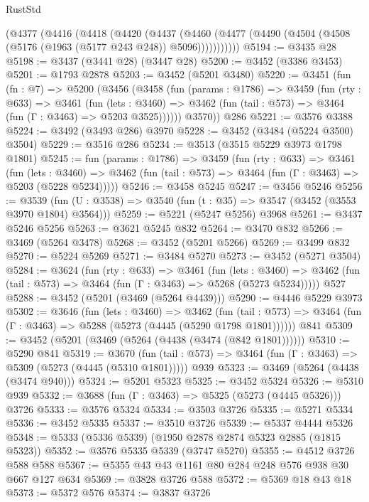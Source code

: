 \begin{lexlean}{RustStd}
\begin{coremodule}
    (@4377
      (@4416
        (@4418
          (@4420
            (@4437
              (@4460 (@4477 (@4490 (@4504 (@4508 (@5176 (@1963 (@5177 @243 @248)) @5096)))))))))))
@5194 := @3435 @28
@5198 := @3437 (@3441 @28) (@3447 @28)
@5200 := @3452 (@3386 @3453)
@5201 := @1793 @2878
@5203 := @3452 (@5201 @3480)
@5220 := @3451
    (fun (fn : @7) =>
    @5200
      (@3456
        (@3458
          (fun (params : @1786) =>
          @3459
            (fun (rty : @633) =>
            @3461
              (fun (lets : @3460) =>
              @3462 (fun (tail : @573) => @3464 (fun (Γ : @3463) => @5203 @3525))))))
        @3570))
    @286
@5221 := @3576 @3388
@5224 := @3492 (@3493 @286) @3970
@5228 := @3452 (@3484 (@5224 @3500) @3504)
@5229 := @3516 @286
@5234 := @3513 (@3515 @5229 @3973 @1798 @1801)
@5245 := fun (params : @1786) =>
  @3459
    (fun (rty : @633) =>
    @3461
      (fun (lets : @3460) =>
      @3462 (fun (tail : @573) => @3464 (fun (Γ : @3463) => @5203 (@5228 @5234)))))
@5246 := @3458 @5245
@5247 := @3456 @5246
@5256 := @3539 (fun (U : @3538) => @3540 (fun (t : @35) => @3547 (@3452 (@3553 @3970 @1804) @3564)))
@5259 := @5221 (@5247 @5256) @3968
@5261 := @3437 @5246 @5256
@5263 := @3621 @5245 @832
@5264 := @3470 @832
@5266 := @3469 (@5264 @3478)
@5268 := @3452 (@5201 @5266)
@5269 := @3499 @832
@5270 := @5224 @5269
@5271 := @3484 @5270
@5273 := @3452 (@5271 @3504)
@5284 := @3624
    (fun (rty : @633) =>
    @3461
      (fun (lets : @3460) =>
      @3462 (fun (tail : @573) => @3464 (fun (Γ : @3463) => @5268 (@5273 @5234)))))
    @527
@5288 := @3452 (@5201 (@3469 (@5264 @4439)))
@5290 := @4446 @5229 @3973
@5302 := @3646
    (fun (lets : @3460) =>
    @3462
      (fun (tail : @573) => @3464 (fun (Γ : @3463) => @5288 (@5273 (@4445 (@5290 @1798 @1801))))))
    @841
@5309 := @3452 (@5201 (@3469 (@5264 (@4438 (@3474 (@842 @1801))))))
@5310 := @5290 @841
@5319 := @3670
    (fun (tail : @573) => @3464 (fun (Γ : @3463) => @5309 (@5273 (@4445 (@5310 @1801)))))
    @939
@5323 := @3469 (@5264 (@4438 (@3474 @940)))
@5324 := @5201 @5323
@5325 := @3452 @5324
@5326 := @5310 @939
@5332 := @3688 (fun (Γ : @3463) => @5325 (@5273 (@4445 @5326))) @3726
@5333 := @3576 @5324
@5334 := @3503 @3726
@5335 := @5271 @5334
@5336 := @3452 @5335
@5337 := @3510 @3726
@5339 := @5337 @4444 @5326
@5348 := @5333 (@5336 @5339) (@1950 @2878 @2874 @5323 @2885 (@1815 @5323))
@5352 := @3576 @5335 @5339 (@3747 @5270)
@5355 := @4512 @3726 @588 @588
@5367 := @5355 @43 @43 @1161 @80 @284 @248 @576 @938 @30 @667 @127 @634
@5369 := @3828 @3726 @588
@5372 := @5369 @18 @43 @18
@5373 := @5372 @576
@5374 := @3837 @3726

\end{coremodule}
\end{lexlean}

